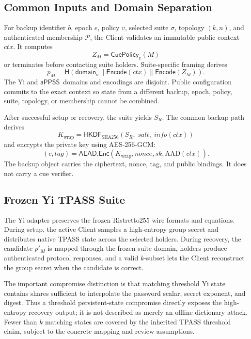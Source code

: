 \documentclass[sigconf,anonymous]{acmart}
\newcommand{\APPSS}{\ensuremath{\mathsf{aPPSS}}}
\newcommand{\CuePolicy}{\ensuremath{\mathsf{CuePolicy}}}
\newcommand{\Encode}{\ensuremath{\mathsf{Encode}}}
\newcommand{\Hash}{\ensuremath{\mathsf{H}}}
\newcommand{\HKDF}{\ensuremath{\mathsf{HKDF}}}
\newcommand{\AEAD}{\ensuremath{\mathsf{AEAD}}}
\begin{document}
\subsection{Common Inputs and Domain Separation}

For backup identifier \(b\), epoch \(e\), policy \(v\), selected suite
\(\sigma\), topology \((k,n)\), and authenticated membership \(\mathcal{P}\),
the Client validates an immutable public context \(ctx\). It computes
\[
  Z_M=\CuePolicy_v(M)
\]
or terminates before contacting suite holders. Suite-specific framing derives
\[
  p_M = \Hash(\textsf{domain}_{\sigma}\parallel
              \Encode(ctx)\parallel \Encode(Z_M)).
\]
The Yi and \APPSS\ domains and encodings are disjoint. Public configuration
commits to the exact context so state from a different backup, epoch, policy,
suite, topology, or membership cannot be combined.

After successful setup or recovery, the suite yields \(S_R\). The common
backup path derives
\[
  K_{\mathrm{wrap}} =
  \HKDF_{\mathrm{SHA256}}(S_R,\; salt,\; info(ctx))
\]
and encrypts the private key using AES-256-GCM:
\[
  (c,tag)=\AEAD.\mathsf{Enc}(K_{\mathrm{wrap}},nonce,sk,\mathrm{AAD}(ctx)).
\]
The backup object carries the ciphertext, nonce, tag, and public bindings. It
does not carry a cue verifier.

\subsection{Frozen Yi TPASS Suite}

The Yi adapter preserves the frozen Ristretto255 wire formats and equations.
During setup, the active Client samples a high-entropy group secret and
distributes native TPASS state across the selected holders. During recovery,
the candidate \(p'_M\) is mapped through the frozen suite domain, holders
produce authenticated protocol responses, and a valid \(k\)-subset lets the
Client reconstruct the group secret when the candidate is correct.

The important compromise distinction is that matching threshold Yi state
contains shares sufficient to interpolate the password scalar, secret
exponent, and digest. Thus a threshold persistent-state compromise directly
exposes the high-entropy recovery output; it is not described as merely an
offline dictionary attack. Fewer than \(k\) matching states are covered by
the inherited TPASS threshold claim, subject to the concrete mapping and
review assumptions.
\end{document}

